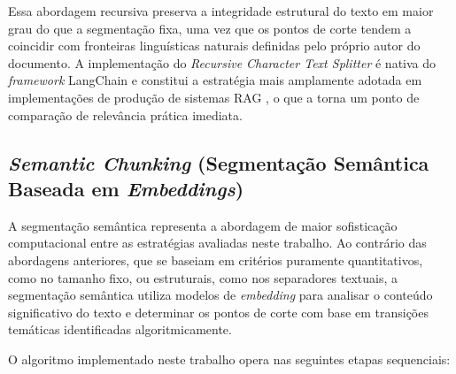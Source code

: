 \documentclass[
	12pt,				%
	openright,			%
	oneside,			%
	a4paper,			%
	tccpreliminar,		%
	]{ABNT-DC-UEL}
\begin{document}
Essa abordagem recursiva preserva a integridade estrutural do texto em maior grau do que a segmentação fixa, uma vez que os pontos de corte tendem a coincidir com fronteiras linguísticas naturais definidas pelo próprio autor do documento. A implementação do \textit{Recursive Character Text Splitter} é nativa do \textit{framework} LangChain e constitui a estratégia mais amplamente adotada em implementações de produção de sistemas RAG \cite{finardi2024chronicles}, o que a torna um ponto de comparação de relevância prática imediata.

\subsection{\textit{Semantic Chunking} (Segmentação Semântica Baseada em \textit{Embeddings})}

A segmentação semântica representa a abordagem de maior sofisticação computacional entre as estratégias avaliadas neste trabalho. Ao contrário das abordagens anteriores, que se baseiam em critérios puramente quantitativos, como no tamanho fixo, ou estruturais, como nos separadores textuais, a segmentação semântica utiliza modelos de \textit{embedding} para analisar o conteúdo significativo do texto e determinar os pontos de corte com base em transições temáticas identificadas algoritmicamente.

O algoritmo implementado neste trabalho opera nas seguintes etapas sequenciais:
\end{document}
